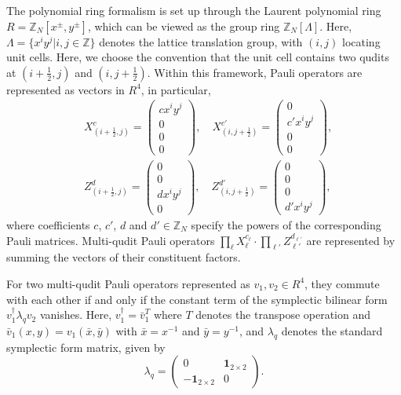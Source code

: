 \documentclass[aps,prb,english,superscriptaddress,twocolumn,tightenlines,showpacs,longbibliography,floatfix,amsfonts]{revtex4-2}
\newcommand{\dg}{\dagger}
\begin{document}
The polynomial ring formalism is set up through the Laurent polynomial ring $R=\mathbb{Z}_N[x^\pm,y^\pm]$, which can be viewed as the group ring $\mathbb{Z}_N[\Lambda]$. Here, $\Lambda=\{x^iy^j|i,j\in \mathbb{Z}\}$ denotes the lattice translation group, with $(i,j)$ locating unit cells. Here, we choose the convention that the unit cell contains two qudits at $(i+\frac{1}{2},j)$ and $(i,j+\frac{1}{2})$. Within this framework,  Pauli operators are represented as vectors in $R^4$, in particular,
\begin{equation}
    \begin{aligned}
    &X_{(i+\frac{1}{2},j)}^{c}=\begin{pmatrix}
        cx^iy^j\\0\\0\\0
    \end{pmatrix},\quad X_{(i,j+\frac{1}{2})}^{c'}=\begin{pmatrix}
        0\\c'x^iy^j\\0\\0
    \end{pmatrix},\\
    &Z_{(i+\frac{1}{2},j)}^{d}=\begin{pmatrix}
        0\\0\\dx^iy^j\\0
    \end{pmatrix},\quad Z_{(i,j+\frac{1}{2})}^{d'}=\begin{pmatrix}
        0\\0\\0\\d'x^iy^j
    \end{pmatrix},
    \end{aligned}\label{eq:polynomial_representations}
\end{equation}
where coefficients $c$, $c'$, $d$ and $d'\in \mathbb{Z}_N$ specify the powers of the corresponding Pauli matrices. 
Multi-qudit Pauli operators $\prod_{\ell}X_{\ell}^{c_\ell} \cdot \prod_{\ell'}Z_{\ell'}^{d_{\ell'}}$ are represented by summing the vectors of their constituent factors.

For two multi-qudit Pauli operators represented as $v_1,v_2\in R^4$, they commute with each other if and only if the constant term of the symplectic bilinear form ${v}_1^\dg\lambda_qv_2$ vanishes. Here, $v_1^{\dg}=\bar{v}_1^T$ where $T$ denotes the transpose operation and $\bar{v}_1(x,y)=v_1(\bar{x},\bar{y})$ with $\bar{x}=x^{-1}$ and $\bar{y}=y^{-1}$, and $\lambda_q$ denotes the standard symplectic form matrix, given by
\begin{equation}
    \lambda_q=\begin{pmatrix}
        0&\mathbf{1}_{2\times 2}\\-\mathbf{1}_{2\times 2}&0
    \end{pmatrix}.
\end{equation}
  
\end{document}
